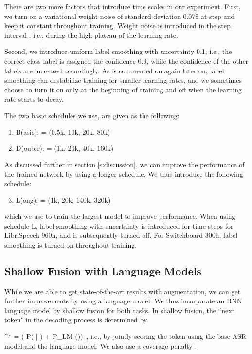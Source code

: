 \documentclass[a4paper]{article}
\newcommand{\be}{}
\begin{document}
There are two more factors that introduce time scales in our experiment. First, we turn on a variational weight noise \cite{graves-nips-2011} of standard deviation 0.075 at step  and keep it constant throughout training. Weight noise is introduced in the step interval , i.e., during the high plateau of the learning rate.

Second, we introduce uniform label smoothing \cite{lbsm} with uncertainty 0.1, i.e., the correct class label is assigned the confidence 0.9, while the confidence of the other labels are increased accordingly. As is commented on again later on, label smoothing can destabilize training for smaller learning rates, and we sometimes choose to turn it on only at the beginning of training and off when the learning rate starts to decay.

The two basic schedules we use, are given as the following:
\begin{enumerate}
\item B(asic):  = (0.5k, 10k, 20k, 80k)
\item D(ouble):  = (1k, 20k, 40k, 160k)
\end{enumerate}
As discussed further in section \ref{s:discussion}, we can improve the performance of the trained network by using a longer schedule. We thus introduce the following schedule:
\begin{enumerate}
  \setcounter{enumi}{2}
  \item L(ong):  = (1k, 20k, 140k, 320k)
\end{enumerate}
which we use to train the largest model to improve performance. When using schedule L, label smoothing with uncertainty  is introduced for time steps  for LibriSpeech 960h, and is subsequently turned off. For Switchboard 300h, label smoothing is turned on throughout training.


\subsection{Shallow Fusion with Language Models}


While we are able to get state-of-the-art results with augmentation, we can get further improvements by using a language model. We thus incorporate an RNN language model by shallow fusion for both tasks. In shallow fusion, the ``next token"  in the decoding process is determined by
\be
{}^* =  \left( \log P( | ) + \lambda \log P_{LM} ()\right) \,,
\ee
i.e., by jointly scoring the token using the base ASR model and the language model. We also use a coverage penalty  \cite{chorowski-2017-interspeech}.
\end{document}
